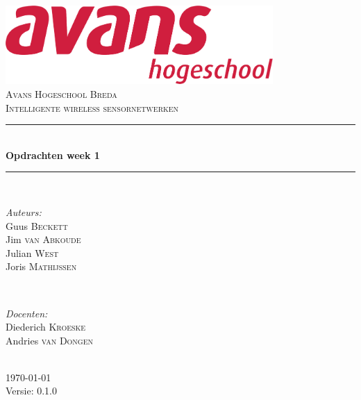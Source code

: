 \documentclass[12pt]{article}
\begin{document}
\begin{titlepage}
\newcommand{\HRule}{\rule{\linewidth}{0.5mm}} %

\center %

\includegraphics[height=3cm] {avans}\\%
\textsc{\Large Avans Hogeschool Breda}\\[0.5cm] %
\textsc{\large Intelligente wireless sensornetwerken }\\[0.5cm] %
\HRule \\[0.4cm]
{ \huge \bfseries Opdrachten week 1}\\[0.4cm] %
\HRule \\[1.5cm]

\begin{minipage}{0.4\textwidth}
\begin{flushleft} \large
\emph{Auteurs:}\\
Guus \textsc{Beckett} \\%
Jim \textsc{van Abkoude} \\
Julian \textsc{West} \\
Joris \textsc{Mathijssen}
\end{flushleft}
\end{minipage}
~
\begin{minipage}{0.4\textwidth}
\begin{flushright} \large
\emph{Docenten:} \\
Diederich \textsc{Kroeske} \\ %
Andries \textsc{van Dongen} \\ %
\end{flushright}
\end{minipage}\\[4cm]

{\large \today}\\[3cm] %

Versie: 0.1.0

\vfill %

\end{titlepage}
\end{document}

